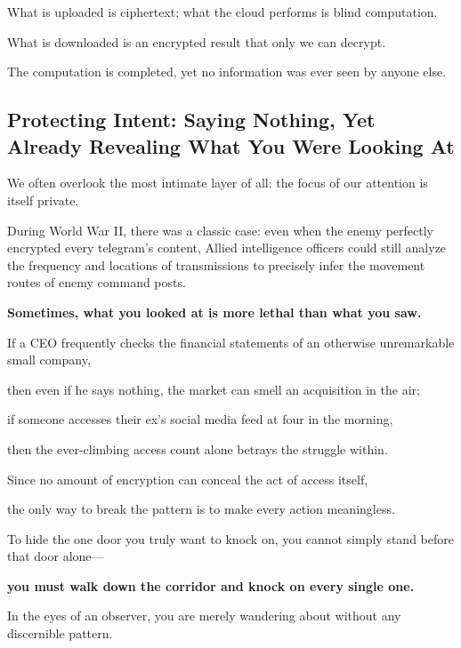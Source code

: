 What is uploaded is ciphertext; what the cloud performs is blind computation.

What is downloaded is an encrypted result that only we can decrypt.

\begin{importantbox}
The computation is completed, yet no information was ever seen by anyone else.
\end{importantbox}

\newpage
\subsection{Protecting Intent: Saying Nothing, Yet Already Revealing What You Were Looking At}

We often overlook the most intimate layer of all: the focus of our attention is itself private.

\vspace{1em}

During World War II, there was a classic case: even when the enemy perfectly encrypted every telegram's content, Allied intelligence officers could still analyze the frequency and locations of transmissions to precisely infer the movement routes of enemy command posts.

\vspace{1em}

\textbf{Sometimes, what you looked at is more lethal than what you saw.}

If a CEO frequently checks the financial statements of an otherwise unremarkable small company,

then even if he says nothing, the market can smell an acquisition in the air;

if someone accesses their ex's social media feed at four in the morning,

then the ever-climbing access count alone betrays the struggle within.

\vspace{1em}

Since no amount of encryption can conceal the act of access itself,

the only way to break the pattern is to make every action meaningless.

To hide the one door you truly want to knock on, you cannot simply stand before that door alone---

\textbf{you must walk down the corridor and knock on every single one.}

In the eyes of an observer, you are merely wandering about without any discernible pattern.

